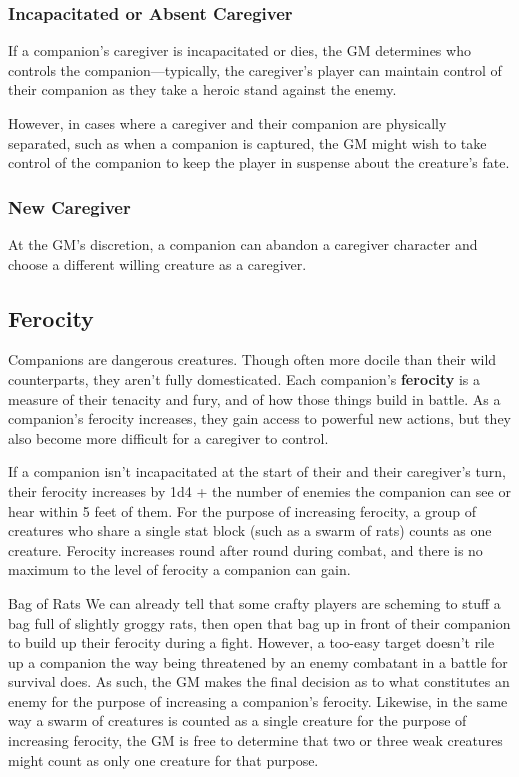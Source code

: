 \documentclass[10pt,a4paper,twoside,bg=print,twocolumn,openany,nodeprecatedcode]{dndbook}
\begin{document}
\subsubsection{Incapacitated or Absent Caregiver}
If a companion's caregiver is incapacitated or dies, the GM determines who controls the companion—typically, the caregiver's player can maintain control of their companion as they take a heroic stand against the enemy.

However, in cases where a caregiver and their companion are physically separated, such as when a companion is captured, the GM might wish to take control of the companion to keep the player in suspense about the creature's fate.

\subsubsection{New Caregiver}
At the GM's discretion, a companion can abandon a caregiver character and choose a different willing creature as a caregiver.

\subsection{Ferocity}
Companions are dangerous creatures. Though often more docile than their wild counterparts, they aren't fully domesticated. Each companion's \textbf{ferocity} is a measure of their tenacity and fury, and of how those things build in battle. As a companion's ferocity increases, they gain access to powerful new actions, but they also become more difficult for a caregiver to control.

If a companion isn't incapacitated at the start of their and their caregiver's turn, their ferocity increases by 1d4 + the number of enemies the companion can see or hear within 5 feet of them. For the purpose of increasing ferocity, a group of creatures who share a single stat block (such as a swarm of rats) counts as one creature. Ferocity increases round after round during combat, and there is no maximum to the level of ferocity a companion can gain.

\begin{DndSidebar}[float=!b]{Bag of Rats}
We can already tell that some crafty players are scheming to stuff a bag full of slightly groggy rats, then open that bag up in front of their companion to build up their ferocity during a fight. However, a too-easy target doesn't rile up a companion the way being threatened by an enemy combatant in a battle for survival does. As such, the GM makes the final decision as to what constitutes an enemy for the purpose of increasing a companion's ferocity. Likewise, in the same way a swarm of creatures is counted as a single creature for the purpose of increasing ferocity, the GM is free to determine that two or three weak creatures might count as only one creature for that purpose.



\end{DndSidebar}
\end{document}
